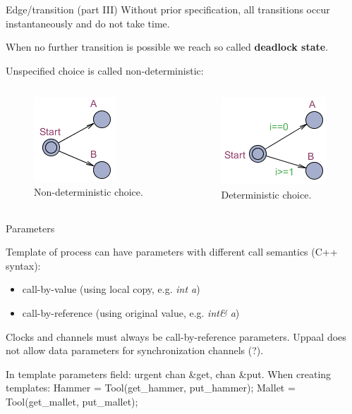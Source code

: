 \documentclass{beamer}
\begin{document}
\begin{frame}{Edge/transition (part III)}
	Without prior specification, all transitions occur instantaneously and do not take time.\newline
	
	When no further transition is possible we reach so called \textbf{deadlock state}.\newline
	
	Unspecified choice is called non-deterministic:\newline
	\vspace{-8mm}
	\begin{columns}
		\begin{column}{.5\textwidth}
			\begin{figure}[H]
				\label{img:ndc}
				\includegraphics[scale=0.7]{img/uppaal_non_deterministic_choice.png}
				\caption{Non-deterministic choice.}
			\end{figure}
		\end{column}
		\begin{column}{.5\textwidth}
			\begin{figure}[H]
				\label{img:dc}
				\includegraphics[scale=0.7]{img/uppaal_deterministic_choice.png}
				\caption{Deterministic choice.}
			\end{figure}
		\end{column}		
	\end{columns}
\end{frame}

\begin{frame}{Parameters}
	
	Template of process can have parameters with different call semantics (C++ syntax):
	
	\begin{itemize}
		\item call-by-value (using local copy, e.g. \textit{int a})
		\item call-by-reference (using original value, e.g. \textit{int\& a})
	\end{itemize}
	
	Clocks and channels must always be call-by-reference parameters.
	Uppaal does not allow data parameters for synchronization channels (?).
	
	In template parameters field: urgent chan \&get, chan \&put.
	When creating templates:
	Hammer = Tool(get\_hammer, put\_hammer);
	Mallet = Tool(get\_mallet, put\_mallet);
\end{frame}
\end{document}
